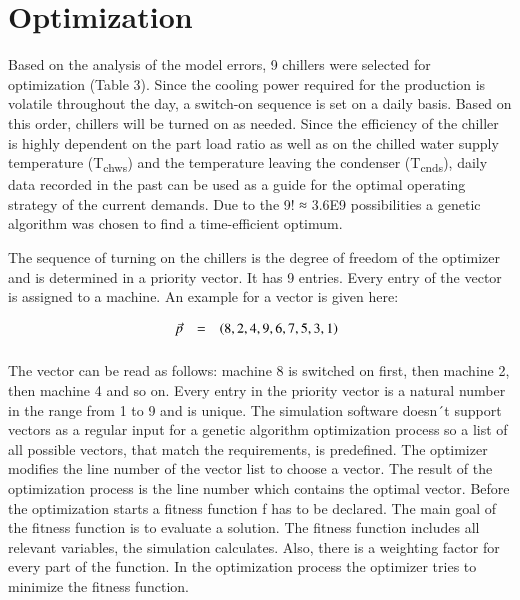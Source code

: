 \documentclass[3p,times,procedia,twocolumn,twoside]{elsarticle}
\begin{document}
\section{Optimization}
Based on the analysis of the model errors, 9 chillers were selected for optimization (Table 3). Since the cooling power required for the production is volatile throughout the day, a switch-on sequence is set on a daily basis. Based on this order, chillers will be turned on as needed. Since the efficiency of the chiller is highly dependent on the part load ratio as well as on the chilled water supply temperature (T\textsubscript{chws}) and the temperature leaving the condenser (T\textsubscript{cnds}), daily data recorded in the past can be used as a guide for the optimal operating strategy of the current demands. Due to the 9! ≈ 3.6E9 possibilities a genetic algorithm was chosen to find a time-efficient optimum.

The sequence of turning on the chillers is the degree of freedom of the optimizer and is determined in a priority vector. It has 9 entries. Every entry of the vector is assigned to a machine. An example for a vector is given here:

\begin{equation}
\begin{array}{@{}lcl}

\displaystyle 
\vec{p} &=& 
\displaystyle 
\left(8,2,4,9,6,7,5,3,1\right)
\\[6pt]

\end{array}\vspace*{-12pt}
\end{equation}

The vector can be read as follows: machine 8 is switched on first, then machine 2, then machine 4 and so on. Every entry in the priority vector is a natural number in the range from 1 to 9 and is unique. The simulation software doesn´t support vectors as a regular input for a genetic algorithm optimization process so a list of all possible vectors, that match the requirements, is predefined. The optimizer modifies the line number of the vector list to choose a vector. The result of the optimization process is the line number which contains the optimal vector.
Before the optimization starts a fitness function f has to be declared. The main goal of the fitness function is to evaluate a solution. The fitness function includes all relevant variables, the simulation calculates. Also, there is a weighting factor for every part of the function. In the optimization process the optimizer tries to minimize the fitness function.
\end{document}
